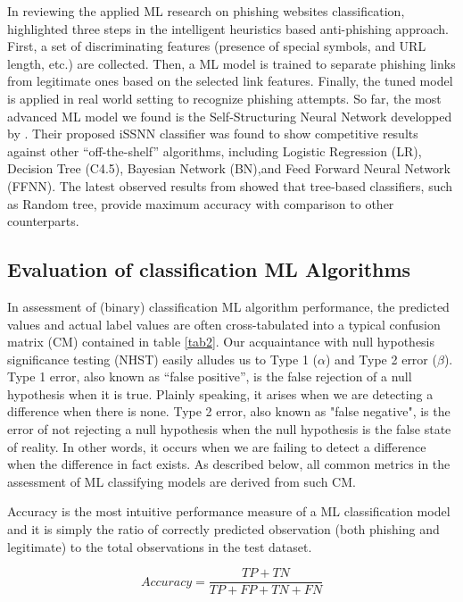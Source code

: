 \documentclass[]{interact}
\theoremstyle{plain}%
\theoremstyle{definition}
\theoremstyle{remark}
\begin{document}
In reviewing the applied ML research on phishing websites classification,   \cite{Mohammad2015a} highlighted three steps in the intelligent  heuristics  based  anti-phishing approach.  First, a set of discriminating features (presence of special symbols, and URL length, etc.) are collected. Then,  a ML model is trained to separate phishing links from legitimate ones based on the selected link features. Finally, the tuned model is applied in real world setting to recognize phishing attempts.  So far, the most advanced ML model we found is the Self-Structuring Neural Network developped by \cite{7727750}. Their proposed iSSNN classifier was found to show competitive results against other ``off-the-shelf'' algorithms, including Logistic Regression (LR), Decision Tree (C4.5), Bayesian Network (BN),and  Feed Forward Neural Network (FFNN).
The latest observed results from \cite{10.1007/978-981-10-5699-4_50}  showed that tree-based classifiers, such as Random tree,  provide maximum accuracy with comparison to other counterparts.


\subsection{Evaluation of classification  ML Algorithms}

In assessment of (binary) classification  ML algorithm performance, the predicted  values and actual label values  are often cross-tabulated into  a typical confusion matrix (CM) contained in  table \ref{tab2}. Our acquaintance with null hypothesis  significance  testing (NHST) easily alludes us to Type 1 ($\alpha$) and  Type 2 error ($\beta$). Type 1 error,  also known as “false positive”, is the false rejection of a null hypothesis when it is true. Plainly speaking, it arises when we are detecting a difference when there is none. Type 2  error, also known as "false negative", is the error of not rejecting a null hypothesis when the null hypothesis is the false state of reality. In other words, it occurs when we are failing to detect a difference when the difference in fact exists. As described below, all common metrics in the assessment of ML classifying models are derived from such CM.

Accuracy is the most intuitive performance measure of a ML classification model  and it is simply the ratio of correctly predicted observation (both phishing and legitimate) to the total observations in the test dataset.

\begin{equation}
Accuracy = \frac {TP+TN}{TP+FP+TN+FN}
\end{equation}
\end{document}
